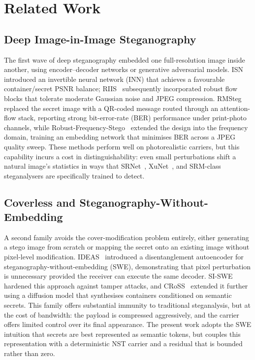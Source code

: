 \documentclass[runningheads]{llncs}
\begin{document}
\section{Related Work}

\subsection{Deep Image-in-Image Steganography}
The first wave of deep steganography embedded one full-resolution image inside another, using encoder--decoder networks or generative adversarial models. ISN~\cite{isn} introduced an invertible neural network (INN) that achieves a favourable container/secret PSNR balance; RIIS~\cite{riis} subsequently incorporated robust flow blocks that tolerate moderate Gaussian noise and JPEG compression. RMSteg~\cite{rmsteg} replaced the secret image with a QR-coded message routed through an attention-flow stack, reporting strong bit-error-rate (BER) performance under print-photo channels, while Robust-Frequency-Stego~\cite{rfs2023} extended the design into the frequency domain, training an embedding network that minimises BER across a JPEG quality sweep. These methods perform well on photorealistic carriers, but this capability incurs a cost in distinguishability: even small perturbations shift a natural image's statistics in ways that SRNet~\cite{srnet}, XuNet~\cite{xunet}, and SRM-class~\cite{srm} steganalysers are specifically trained to detect.

\subsection{Coverless and Steganography-Without-Embedding}
A second family avoids the cover-modification problem entirely, either generating a stego image from scratch or mapping the secret onto an existing image without pixel-level modification. IDEAS~\cite{ideas2022} introduced a disentanglement autoencoder for steganography-without-embedding (SWE), demonstrating that pixel perturbation is unnecessary provided the receiver can execute the same decoder. SI-SWE~\cite{siswe2023} hardened this approach against tamper attacks, and CRoSS~\cite{cross} extended it further using a diffusion model that synthesises containers conditioned on semantic secrets. This family offers substantial immunity to traditional steganalysis, but at the cost of bandwidth: the payload is compressed aggressively, and the carrier offers limited control over its final appearance. The present work adopts the SWE intuition that secrets are best represented as semantic tokens, but couples this representation with a deterministic NST carrier and a residual that is bounded rather than zero.
\end{document}
